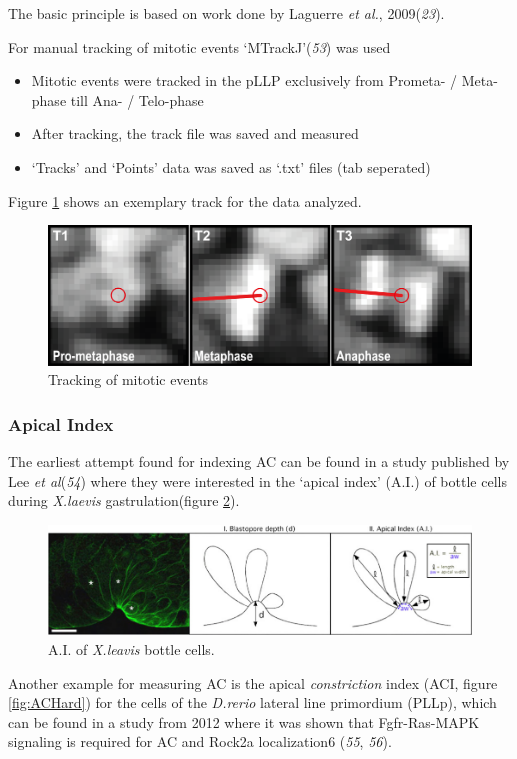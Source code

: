 \documentclass[11pt,singlespacinge,twoside]{reedthesis} %
\providecommand{\tightlist}{%
  \setlength{\itemsep}{0pt}\setlength{\parskip}{0pt}}
\begin{document}
The basic principle is based on work done by Laguerre \emph{et al.}, 2009(\emph{23}).

\noindent For manual tracking of mitotic events `MTrackJ'(\emph{53}) was used
\begin{itemize}
\tightlist
\item
  Mitotic events were tracked in the pLLP exclusively from Prometa- / Meta-phase till Ana- / Telo-phase
\item
  After tracking, the track file was saved and measured
\item
  `Tracks' and `Points' data was saved as `.txt' files (tab seperated)
\end{itemize}
\noindent Figure \ref{fig:mitodatapoints} shows an exemplary track for the data analyzed.


\begin{figure}

{\centering \includegraphics[width=0.5\linewidth]{figure/02-MaMo/Prol/Prolif} 

}

\caption{Tracking of mitotic events}\label{fig:mitodatapoints}
\end{figure}
\hypertarget{ACI}{%
\subsubsection{Apical Index}\label{ACI}}

The earliest attempt found for indexing AC can be found in a study published by Lee \emph{et al}(\emph{54}) where they were interested in the `apical index' (A.I.) of bottle cells during \emph{X.laevis} gastrulation(figure \ref{fig:ACLee}).


\begin{figure}

{\centering \includegraphics[width=0.75\linewidth]{figure/02-MaMo/ACI/Jen_yi_Lee} 

}

\caption{A.I. of \emph{X.leavis} bottle cells.}\label{fig:ACLee}
\end{figure}
\noindent Another example for measuring AC is the apical \emph{constriction} index (ACI, figure \ref{fig:ACHard}) for the cells of the \emph{D.rerio} lateral line primordium (PLLp), which can be found in a study from 2012 where it was shown that Fgfr-Ras-MAPK signaling is required for AC and Rock2a localization6 (\emph{55}, \emph{56}).
\end{document}
